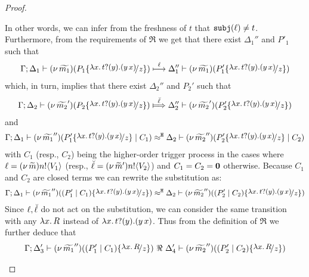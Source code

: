 \begin{proof}
\begin{enumerate}
				In other words, we can infer from the freshness of $t$ that $\mathtt{subj}(\ell) \not= t$.
				Furthermore, from the requirements of $\Re$
				we get that there exist $\Delta_1''$ and $P'_1$ such that
				\begin{eqnarray*}
					\horel{\Gamma}{\Delta_1}{\newsp{\widetilde{m_1}}{P_1 \subst{\trvalx{t}}{z} }}
					{\hby{\ell}}
					{\Delta_1''}{\newsp{\widetilde{m_1}}{P_1' \subst{\trvalx{t}}{z} }}
				\end{eqnarray*}
				which, in turn, implies that there exist $\Delta_2''$ and $P_2'$ such that
				\begin{eqnarray}
					\horel{\Gamma}{\Delta_2}{\newsp{\widetilde{m_2}'}{P_2 \subst{\trvalx{t}}{z} }}
					{\Hby{\mact{\ell}}}
					{\Delta_2''}{\newsp{\widetilde{m_2}'}{P_2' \subst{\trvalx{t}}{z} }}
					\label{lem:proc_subst0}
				\end{eqnarray}
				and
				\begin{eqnarray*}
					\horel{\Gamma}{\Delta_1}{\newsp{\widetilde{m_1}''}{P_1' \subst{\trvalx{t}}{z} \Par C_1}}
					{\hwb}
					{\Delta_2}{\newsp{\widetilde{m_2}''}{P_2' \subst{\trvalx{t}}{z} \Par C_2}}
				\end{eqnarray*}
				with $C_1$ (resp., $C_2$) being the higher-order trigger process
				in the cases where $\ell = (\nu\, \widetilde{m}) n ! \langle V_1 \rangle$ (resp., $\breve{\ell} = (\nu\, \widetilde{m}') n ! \langle V_2 \rangle$)
				and $C_1 = C_2 = \mathbf{0}$ otherwise.
				Because $C_1$ and $C_2$ are closed terms we can rewrite the substitution as:
				\begin{eqnarray*}
					\horel{\Gamma}{\Delta_1}{\newsp{\widetilde{m_1}''}{(P_1'\Par C_1) \subst{\trvalx{t}}{z}}}
					{\hwb}
					{\Delta_2}{\newsp{\widetilde{m_2}''}{(P_2'\Par C_2) \subst{\trvalx{t}}{z}}}
				\end{eqnarray*}
				Since $\ell, \breve{\ell}$ do not act on the substitution,
				we can consider the same transition with any $\lambda x.\,R$ instead of $\lambda x.\,t ? (y) . (y\, {x})$.
				Thus from the definition of $\Re$ we further deduce that
				\begin{eqnarray}
					\horel{\Gamma}{\Delta_3'}{\newsp{\widetilde{m_1}''}{(P_1'\Par C_1) \subst{{\abs{x}{R}}}{z}}}
					{\ \Re\ }
					{\Delta_4'}{\newsp{\widetilde{m_2}''}{(P_2'\Par C_2) \subst{{\abs{x}{R}}}{z}}}
					\label{lem:proc_subst33}
				\end{eqnarray}
				{\color{blue}{Note that $C_1$ and $C_2$ appear to meet the bisimulation
				requirements on the output case.}}


\end{enumerate}
\end{proof}
